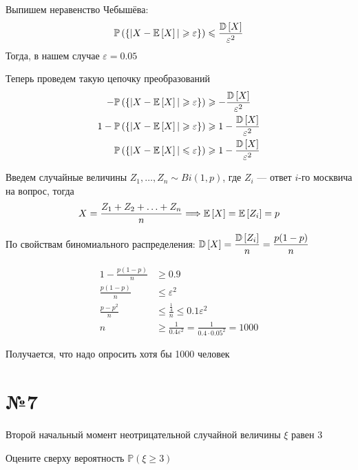 \documentclass{article}
\begin{document}
Выпишем неравенство Чебышёва:
\begin{equation*}
    \mathbb{P}\left(\{|X-\mathbb{E}\left[X\right]|\geqslant\varepsilon\}\right)\leqslant\frac{\mathbb{D}\left[X\right]}{\varepsilon^2}
\end{equation*}
Тогда, в нашем случае $\varepsilon=0.05$

Теперь проведем такую цепочку преобразований
\begin{equation*}
    \begin{aligned}
        -\mathbb{P}\left(\{|X-\mathbb{E}\left[X\right]|\geqslant\varepsilon\}\right)&\geqslant-\frac{\mathbb{D}\left[X\right]}{\varepsilon^2}\\
        1-\mathbb{P}\left(\{|X-\mathbb{E}\left[X\right]|\geqslant\varepsilon\}\right)&\geqslant1-\frac{\mathbb{D}\left[X\right]}{\varepsilon^2}\\
        \mathbb{P}\left(\{|X-\mathbb{E}\left[X\right]|\leqslant\varepsilon\}\right)&\geqslant1-\frac{\mathbb{D}\left[X\right]}{\varepsilon^2}
    \end{aligned}
\end{equation*}

Введем случайные величины $Z_1,\ldots,Z_n\sim Bi(1,p)$, где $Z_i$ — ответ $i$-го москвича на вопрос, тогда
\begin{equation*}
    X=\frac{Z_1+Z_2+\ldots+Z_n}{n}\Longrightarrow\mathbb{E}\left[X\right]=\mathbb{E}\left[Z_i\right]=p
\end{equation*} 

По свойствам биномиального распределения: $\mathbb{D}\left[X\right]=\displaystyle\frac{\mathbb{D}\left[Z_i\right]}{n}=\frac{p(1-p)}{n}$

\begin{equation*}
    \begin{aligned}
        1-\frac{p(1-p)}{n}&\geqslant0.9\\
        \frac{p(1-p)}{n}&\leqslant\varepsilon^2\\
        \frac{p-p^2}{n}&\leqslant\frac{\frac{1}{4}}{n}\leqslant0.1\varepsilon^2\\
        n&\geqslant \frac{1}{0.4\varepsilon^2}=\frac{1}{0.4\cdot0.05^2}=1000
    \end{aligned}
\end{equation*}

Получается, что надо опросить хотя бы 1000 человек



\newpage
\section*{№7}
\begin{tcolorbox}[colback=blue!20!white, colframe=black!100!black]
    Второй начальный момент неотрицательной случайной величины $\xi$ равен 3

    Оцените сверху вероятность $\mathbb{P}(\xi \geqslant 3)$
\end{tcolorbox}
\end{document}
